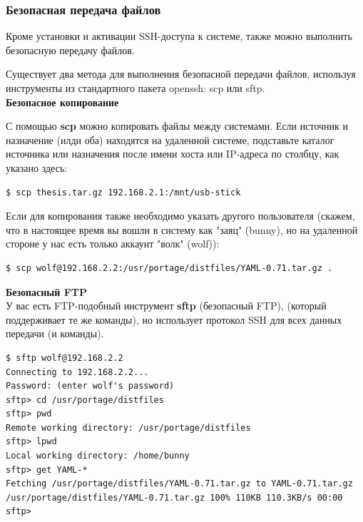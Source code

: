 \documentclass[10pt]{book}
\begin{document}
\subsubsection{Безопасная передача файлов}

Кроме установки и активации SSH-доступа к системе, также можно выполнить безопасную передачу файлов.

Существует два метода для выполнения безопасной передачи файлов, используя инструменты из стандартного пакета openssh: scp или sftp.\\

\textbf{Безопасное копирование}

С помощью \textbf{scp} можно копировать файлы между системами. Если источник и назначение (илди оба) находятся на удаленной системе, подставьте каталог источника или назначения после имени хоста или IP-адреса по столбцу, как указано здесь:

\begin{tcolorbox}
\begin{lstlisting}
$ scp thesis.tar.gz 192.168.2.1:/mnt/usb-stick
\end{lstlisting}
\end{tcolorbox}

Если для копирования также необходимо указать другого пользователя (скажем, что в настоящее время вы вошли в систему как "заяц"{} (bunny), но на удаленной стороне у нас есть только аккаунт "волк"{} (wolf)):

\begin{tcolorbox}
\begin{lstlisting}
$ scp wolf@192.168.2.2:/usr/portage/distfiles/YAML-0.71.tar.gz .
\end{lstlisting}
\end{tcolorbox}

\textbf{Безопасный FTP}\\

У вас есть FTP-подобный инструмент \textbf{sftp} (безопасный FTP), (который поддерживает те же команды), но использует протокол SSH для всех данных передачи (и команды).


\begin{tcolorbox}
\begin{lstlisting}
$ sftp wolf@192.168.2.2
Connecting to 192.168.2.2...
Password: (enter wolf's password)
sftp> cd /usr/portage/distfiles
sftp> pwd
Remote working directory: /usr/portage/distfiles
sftp> lpwd
Local working directory: /home/bunny
sftp> get YAML-*
Fetching /usr/portage/distfiles/YAML-0.71.tar.gz to YAML-0.71.tar.gz
/usr/portage/distfiles/YAML-0.71.tar.gz 100% 110KB 110.3KB/s 00:00
sftp>
\end{lstlisting}
\end{tcolorbox}
\end{document}
